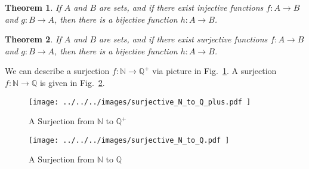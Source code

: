 \documentclass{article}
\theoremstyle{plain}
\newtheorem{theorem}{Theorem}[section]
\theoremstyle{normal}
\begin{document}
        \begin{theorem}
            If $A$ and $B$ are sets, and if there exist injective functions
            $f:A\rightarrow{B}$ and $g:B\rightarrow{A}$, then there is a
            bijective function $h:A\rightarrow{B}$.
        \end{theorem}
        \begin{theorem}
            If $A$ and $B$ are sets, and if there exist surjective functions
            $f:A\rightarrow{B}$ and $g:B\rightarrow{A}$, then there is a
            bijective function $h:A\rightarrow{B}$.
        \end{theorem}
        We can describe a surjection $f:\mathbb{N}\rightarrow\mathbb{Q}^{+}$
        via picture in Fig.~\ref{fig:surjective_N_to_Q_plus}. A surjection
        $f:\mathbb{N}\rightarrow\mathbb{Q}$ is given in
        Fig.~\ref{fig:surjective_N_to_Q}.
        \begin{figure}
            \centering
            \texttt{[image: ../../../images/surjective\_N\_to\_Q\_plus.pdf ]}
            \caption{A Surjection from $\mathbb{N}$ to $\mathbb{Q}^{+}$}
            \label{fig:surjective_N_to_Q_plus}
        \end{figure}
        \begin{figure}
            \centering
            \texttt{[image: ../../../images/surjective\_N\_to\_Q.pdf ]}
            \caption{A Surjection from $\mathbb{N}$ to $\mathbb{Q}$}
            \label{fig:surjective_N_to_Q}
        \end{figure}
\end{document}
